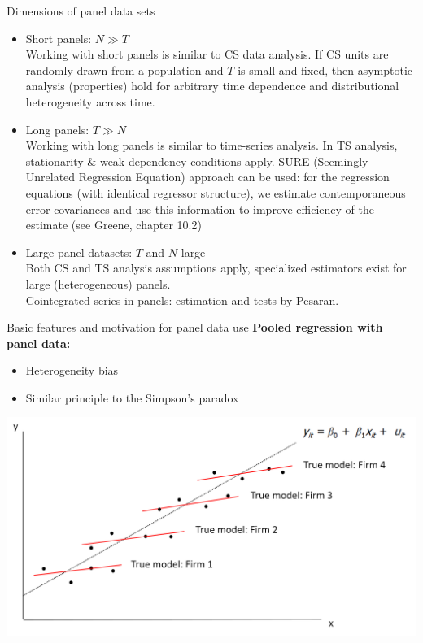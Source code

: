 \documentclass[usenames,dvipsnames]{beamer}
\begin{document}
\begin{frame}{Dimensions of panel data sets}
\footnotesize
\begin{itemize}
\item Short panels: $N \gg T$ \\
Working with short panels is similar to CS data analysis. If CS units are randomly drawn from a population and $T$ is small and fixed, then asymptotic analysis (properties) hold for arbitrary time dependence and distributional heterogeneity across time.
\medskip
\item Long panels: $T \gg N$ \\
Working with long panels is similar to time-series analysis. In TS analysis, stationarity \& weak dependency conditions apply. SURE (Seemingly Unrelated Regression Equation) approach can be used: for the regression equations (with identical regressor structure), we estimate contemporaneous error covariances and use this information to improve efficiency of the estimate (see Greene, chapter 10.2)
\medskip
\item Large panel datasets: $T$ and $N$ large\\
Both CS and TS analysis assumptions apply, specialized estimators exist for large (heterogeneous) panels.\\Cointegrated series in panels: estimation and tests by Pesaran.
\end{itemize}
\end{frame}
\begin{frame}{Basic features and motivation for panel data use}
\textbf{Pooled regression with panel data:} \\ \medskip
\begin{itemize}
    \item Heterogeneity bias
    \medskip
    \item Similar principle to the Simpson's paradox
\end{itemize}
\medskip
\includegraphics[width=\textwidth]{./img/Obrazek4}
\end{frame}
\end{document}
